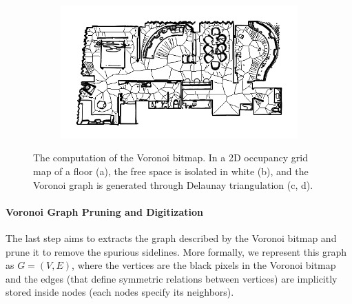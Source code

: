 \begin{figure}[h!]
\begin{subfigure}[b]{0.49\linewidth}
		\caption{}
		\label{fig:pose_estimator_voronoi_bitmap}
	\end{subfigure}
	\hfil
	\begin{subfigure}[b]{0.49\linewidth}
		\centering
		\includegraphics[width=\textwidth]{images/pose_estimator_bitmap_map.png}
		\caption{}
		\label{fig:pose_estimator_voronoi_bitmap_map}
	\end{subfigure}
	\caption{The computation of the Voronoi bitmap. In a 2D occupancy grid map of a floor (a), the free space is isolated in white (b), and the Voronoi graph is generated through Delaunay triangulation (c, d).}
	\label{fig:pose_estimator}
\end{figure}

\newpage

\paragraph*{Voronoi Graph Pruning and Digitization} The last step aims to extracts the graph described by the Voronoi bitmap and prune it to remove the spurious sidelines. More formally, we represent this graph as $G = (V, E)$, where the vertices are the black pixels in the Voronoi bitmap and the edges (that define symmetric relations between vertices) are implicitly stored inside nodes (each nodes specify its neighbors). 

